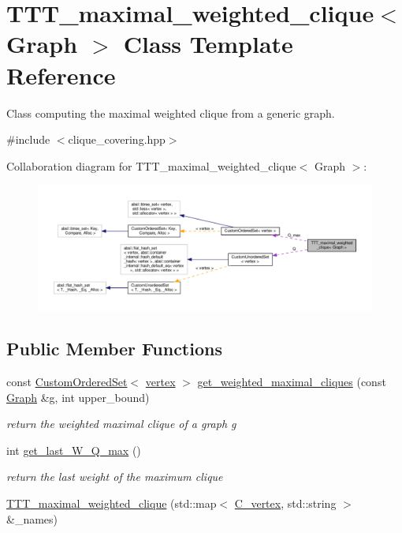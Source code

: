 \hypertarget{classTTT__maximal__weighted__clique}{}\section{T\+T\+T\+\_\+maximal\+\_\+weighted\+\_\+clique$<$ Graph $>$ Class Template Reference}
\label{classTTT__maximal__weighted__clique}


Class computing the maximal weighted clique from a generic graph.  




{\ttfamily \#include $<$clique\+\_\+covering.\+hpp$>$}



Collaboration diagram for T\+T\+T\+\_\+maximal\+\_\+weighted\+\_\+clique$<$ Graph $>$\+:
\nopagebreak
\begin{figure}[H]
\begin{center}
\leavevmode
\includegraphics[width=350pt]{d4/dfd/classTTT__maximal__weighted__clique__coll__graph}
\end{center}
\end{figure}
\subsection*{Public Member Functions}
\begin{DoxyCompactItemize}
\item 
const \hyperlink{classCustomOrderedSet}{Custom\+Ordered\+Set}$<$ \hyperlink{classTTT__maximal__weighted__clique_ac6a30ba8fb726c9c83eafe9dc451a799}{vertex} $>$ \hyperlink{classTTT__maximal__weighted__clique_a4c64ff7e98d014725a49619e95dff252}{get\+\_\+weighted\+\_\+maximal\+\_\+cliques} (const \hyperlink{structGraph}{Graph} \&g, int upper\+\_\+bound)
\begin{DoxyCompactList}\small\item\em return the weighted maximal clique of a graph g \end{DoxyCompactList}\item 
int \hyperlink{classTTT__maximal__weighted__clique_a3ac9a4a7d8f4fd5adfe0708ec06a68c3}{get\+\_\+last\+\_\+\+W\+\_\+\+Q\+\_\+max} ()
\begin{DoxyCompactList}\small\item\em return the last weight of the maximum clique \end{DoxyCompactList}\item 
\hyperlink{classTTT__maximal__weighted__clique_ab941eeae406ba82975e33ff856924698}{T\+T\+T\+\_\+maximal\+\_\+weighted\+\_\+clique} (std\+::map$<$ \hyperlink{clique__covering__graph_8hpp_a9cb45047ea8c5ed95a8cfa90494345aa}{C\+\_\+vertex}, std\+::string $>$ \&\+\_\+names)
\end{DoxyCompactItemize}
